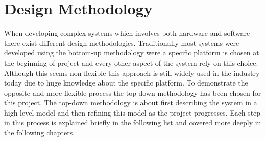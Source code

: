 \chapter{Design Methodology}

When developing complex systems which involves both hardware and software there exist different design methodologies. Traditionally most systems were developed using the bottom-up methodology were a specific platform is chosen at the beginning of project and every other aspect of the system rely on this choice. Although this seems non flexible this approach is still widely used in the industry today due to huge knowledge about the specific platform.
To demonstrate the opposite and more flexible process the top-down methodology has been chosen for this project. The top-down methodology is about first describing the system in a high level model and then refining this model as the project progresses.
Each step in this process is explained briefly in the following list and covered more deeply in the following chapters.


